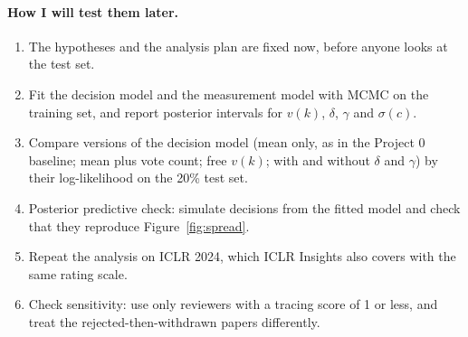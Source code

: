 \documentclass[11pt]{article}
\begin{document}
\paragraph{How I will test them later.}
\begin{enumerate}
\item The hypotheses and the analysis plan are fixed now, before anyone looks at the test set.
\item Fit the decision model and the measurement model with MCMC on the training set, and report posterior intervals for $v(k)$, $\delta$, $\gamma$ and $\sigma(c)$.
\item Compare versions of the decision model (mean only, as in the Project 0 baseline; mean plus vote count; free $v(k)$; with and without $\delta$ and $\gamma$) by their log-likelihood on the 20\% test set.
\item Posterior predictive check: simulate decisions from the fitted model and check that they reproduce Figure~\ref{fig:spread}.
\item Repeat the analysis on ICLR 2024, which ICLR Insights also covers with the same rating scale.
\item Check sensitivity: use only reviewers with a tracing score of 1 or less, and treat the rejected-then-withdrawn papers differently.
\end{enumerate}
\end{document}
